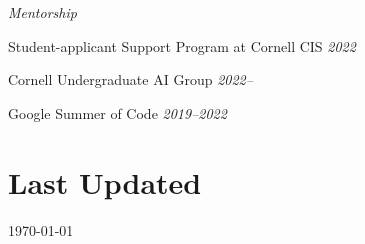 \documentclass[margin]{res}
\begin{document}
\begin{resume}
\begin{compactitem}
	\item \emph{Mentorship}
	\begin{compactitem}
		\item Student-applicant Support Program at Cornell CIS \hfill \emph{2022}
		\item Cornell Undergraduate AI Group \hfill \emph{2022--}
		\item Google Summer of Code \hfill \emph{2019--2022}
	\end{compactitem}
	
	
\end{compactitem}

\section{Last Updated} \today


\end{resume}
\end{document}
